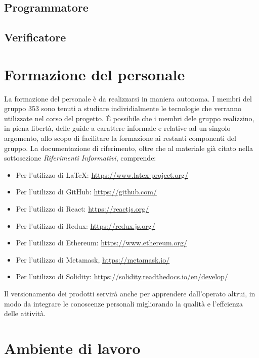 \documentclass[NormeDiProgetto.tex]{subfiles}
\begin{document}
	\subsection{Programmatore}
	\subsection{Verificatore}
	
	\section{Formazione del personale}
	La formazione del personale è da realizzarsi in maniera autonoma. I membri del gruppo 353 sono tenuti a studiare individialmente le tecnologie che verranno utilizzate nel corso del progetto. \'{E} possibile che i membri dele gruppo realizzino, in piena libertà, delle guide a carattere informale e relative ad un singolo argomento, allo scopo di facilitare la formazione ai restanti componenti del gruppo. La documentazione di riferimento, oltre che al materiale già citato nella sottosezione \emph{Riferimenti Informativi}, comprende:\\
	\begin{itemize}
		\item Per l'utilizzo di \LaTeX: \url{https://www.latex-project.org/} \\
		\item Per l'utilizzo di GitHub: \url{https://github.com/}\\
		\item Per l'utilizzo di React: \url{https://reactjs.org/}\\
		\item Per l'utilizzo di Redux: \url{https://redux.js.org/}\\
		\item Per l'utilizzo di Ethereum: \url{https://www.ethereum.org/}\\
		\item Per l'utilizzo di Metamask, \url{https://metamask.io/}\\ 
		\item Per l'utilizzo di Solidity: \url{https://solidity.readthedocs.io/en/develop/}\\
	\end{itemize}
	Il versionamento dei prodotti servirà anche per apprendere dall'operato
	altrui, in modo da integrare le conoscenze personali migliorando la qualità e
	l'effcienza delle attività.
	\section{Ambiente di lavoro}
\end{document}
